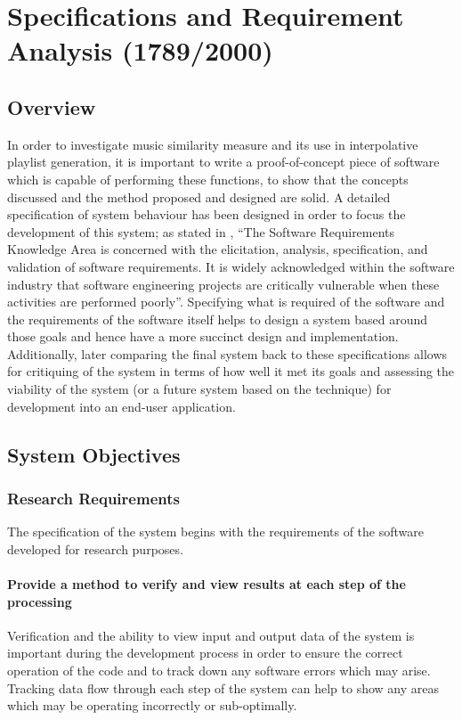 %
%
\newcommand{\objective}[1]{
	\subsubsection{#1}
}
\chapter{Specifications and Requirement Analysis (1789/2000)}
\label{text:spec}
\section{Overview}
In order to investigate music similarity measure and its use in interpolative playlist generation, it is important to write a proof-of-concept piece of software which is capable of performing these functions, to show that the concepts discussed and the method proposed and designed are solid. A detailed specification of system behaviour has been designed in order to focus the development of this system; as stated in \citet{Bourque2004}, ``The Software Requirements Knowledge Area is concerned with the elicitation, analysis, specification, and validation of software requirements. It is widely acknowledged within the software industry that software engineering projects are critically vulnerable when these activities are performed poorly''. Specifying what is required of the software and the requirements of the software itself helps to design a system based around those goals and hence have a more succinct design and implementation. Additionally, later comparing the final system back to these specifications allows for critiquing of the system in terms of how well it met its goals and  assessing the viability of the system (or a future system based on the technique) for development into an end-user application.
\section{System Objectives}
\subsection{Research Requirements}
The specification of the system begins with the requirements of the software developed for research purposes. 
\objective{Provide a method to verify and view results at each step of the processing}
Verification and the ability to view input and output data of the system is important during the development process in order to ensure the correct operation of the code and to track down any software errors which may arise. Tracking data flow through each step of the system can help to show any areas which may be operating incorrectly or sub-optimally.

